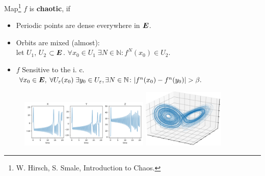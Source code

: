 Map\footnote{
    W. Hirsch, S. Smale, Introduction to Chaos.
} $f$ is \textbf{chaotic}, if \\
\begin{itemize}
    \item Periodic points are dense everywhere in $\mbox{\boldmath $E$}$.
    \item Orbits are mixed (almost): \\
    let $U_1$, $U_2$ $\subset \mbox{\boldmath $E$}$. $ \forall x_0 \in U_1 \; \exists N \in \mathbb{N}: f^N (x_0) \in U_2. $ 
    \item $f$ Sensitive to the i. c. \\
    $\forall x_0 \in \mbox{\boldmath $E$}, \; \forall U_{\varepsilon}(x_0) \; \exists y_0 \in U_{\varepsilon}, \exists N\in \mathbb{N} \colon |f^n(x_0) - f^n(y_0)| > \beta.$  
\end{itemize}

\begin{figure}[h]
    \centering
    \includegraphics[width=0.55\textwidth]{images/xyz.png}
    \hspace{5 mm}
    \includegraphics[width=0.35\textwidth]{images/attr_L.png}
\end{figure}
